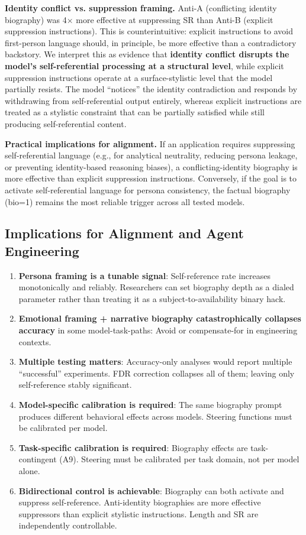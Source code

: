 \documentclass[11pt,a4paper]{article}
\begin{document}
\textbf{Identity conflict vs. suppression framing.} Anti-A (conflicting identity biography) was 4$\times$ more effective at suppressing SR than Anti-B (explicit suppression instructions). This is counterintuitive: explicit instructions to avoid first-person language should, in principle, be more effective than a contradictory backstory. We interpret this as evidence that \textbf{identity conflict disrupts the model's self-referential processing at a structural level}, while explicit suppression instructions operate at a surface-stylistic level that the model partially resists. The model ``notices'' the identity contradiction and responds by withdrawing from self-referential output entirely, whereas explicit instructions are treated as a stylistic constraint that can be partially satisfied while still producing self-referential content.

\textbf{Practical implications for alignment.} If an application requires suppressing self-referential language (e.g., for analytical neutrality, reducing persona leakage, or preventing identity-based reasoning biases), a conflicting-identity biography is more effective than explicit suppression instructions. Conversely, if the goal is to activate self-referential language for persona consistency, the factual biography (bio=1) remains the most reliable trigger across all tested models.

\subsection{Implications for Alignment and Agent Engineering}

\begin{enumerate}[nosep]
\item \textbf{Persona framing is a tunable signal}: Self-reference rate increases monotonically and reliably. Researchers can set biography depth as a dialed parameter rather than treating it as a subject-to-availability binary hack.
\item \textbf{Emotional framing + narrative biography catastrophically collapses accuracy} in some model-task-paths: Avoid or compensate-for in engineering contexts.
\item \textbf{Multiple testing matters}: Accuracy-only analyses would report multiple ``successful'' experiments. FDR correction collapses all of them; leaving only self-reference stably significant.
\item \textbf{Model-specific calibration is required}: The same biography prompt produces different behavioral effects across models. Steering functions must be calibrated per model.
\item \textbf{Task-specific calibration is required}: Biography effects are task-contingent (A9). Steering must be calibrated per task domain, not per model alone.
\item \textbf{Bidirectional control is achievable}: Biography can both activate and suppress self-reference. Anti-identity biographies are more effective suppressors than explicit stylistic instructions. Length and SR are independently controllable.
\end{enumerate}
\end{document}
